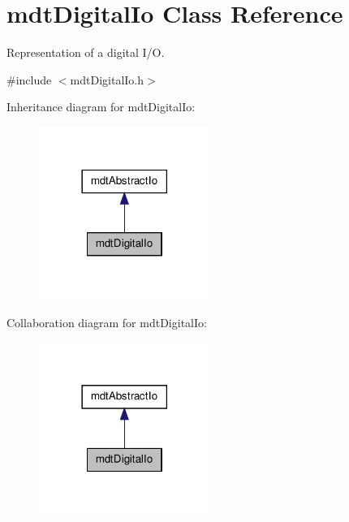 \hypertarget{classmdt_digital_io}{
\section{mdtDigitalIo Class Reference}
\label{classmdt_digital_io}
}


Representation of a digital I/O.  




{\ttfamily \#include $<$mdtDigitalIo.h$>$}



Inheritance diagram for mdtDigitalIo:
\nopagebreak
\begin{figure}[H]
\begin{center}
\leavevmode
\includegraphics[width=158pt]{classmdt_digital_io__inherit__graph}
\end{center}
\end{figure}


Collaboration diagram for mdtDigitalIo:
\nopagebreak
\begin{figure}[H]
\begin{center}
\leavevmode
\includegraphics[width=158pt]{classmdt_digital_io__coll__graph}
\end{center}
\end{figure}
